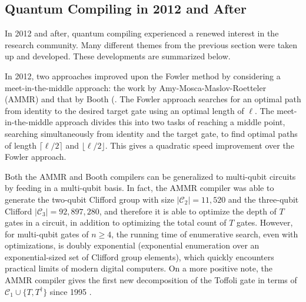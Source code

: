 \subsection{Quantum Compiling in 2012 and After}
\label{subsec:qcompile-post2012}

In 2012 and after, quantum compiling experienced a renewed interest in the
research community. Many different themes from the previous section were
taken up and developed. These developments are summarized below.

In 2012, two approaches improved upon the Fowler method by considering a
meet-in-the-middle approach: the work by Amy-Mosca-Maslov-Roetteler (AMMR)
\cite{Amy2012} and that by Booth (\cite{Booth2012}.
The Fowler approach searches for an
optimal path from identity to the desired target gate using an optimal
length of $\ell$. The meet-in-the-middle approach divides this into two tasks of
reaching a middle point, searching simultaneously from identity and the
target gate, to find optimal paths of length $\lceil \ell/2 \rceil$
and $\lfloor \ell/2 \rfloor$. This gives a quadratic speed improvement over
the Fowler approach.

Both the AMMR and Booth compilers can be generalized to
multi-qubit circuits by feeding in a multi-qubit basis. In fact, the AMMR compiler
was able to generate the two-qubit Clifford group with
size $|\mathcal{C}_2| = 11,520$ and the three-qubit Clifford
$|\mathcal{C}_3| = 92,897,280$, and therefore it is able to optimize
the depth of $T$ gates in a circuit, in addition to optimizing the total
count of $T$ gates. However, for multi-qubit gates of $n \ge 4$,
the running time of enumerative search, even with optimizations, is
doubly exponential (exponential enumeration over an exponential-sized
set of Clifford group elements), which quickly encounters practical limits
of modern digital computers.
On a more positive note, the AMMR compiler gives the first new decomposition
of the Toffoli gate in terms of $\mathcal{C}_1 \cup \{T, T^{\dagger}\}$
since 1995 \cite{Barenco1995a}.

